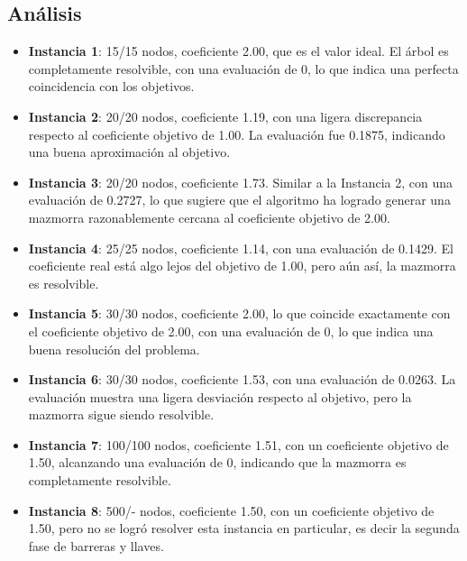 \documentclass[letter, 10pt]{article}
\begin{document}
\subsection*{An\'alisis}

\begin{itemize}
    \item \textbf{Instancia 1}: 15/15 nodos, coeficiente 2.00, que es el valor ideal. El \'arbol es completamente resolvible, con una evaluaci\'on de 0, lo que indica una perfecta coincidencia con los objetivos.
    
    \item \textbf{Instancia 2}: 20/20 nodos, coeficiente 1.19, con una ligera discrepancia respecto al coeficiente objetivo de 1.00. La evaluaci\'on fue 0.1875, indicando una buena aproximaci\'on al objetivo.
    
    \item \textbf{Instancia 3}: 20/20 nodos, coeficiente 1.73. Similar a la Instancia 2, con una evaluaci\'on de 0.2727, lo que sugiere que el algoritmo ha logrado generar una mazmorra razonablemente cercana al coeficiente objetivo de 2.00.
    
    \item \textbf{Instancia 4}: 25/25 nodos, coeficiente 1.14, con una evaluaci\'on de 0.1429. El coeficiente real est\'a algo lejos del objetivo de 1.00, pero a\'un as\'i, la mazmorra es resolvible.
    
    \item \textbf{Instancia 5}: 30/30 nodos, coeficiente 2.00, lo que coincide exactamente con el coeficiente objetivo de 2.00, con una evaluaci\'on de 0, lo que indica una buena resoluci\'on del problema.
    
    \item \textbf{Instancia 6}: 30/30 nodos, coeficiente 1.53, con una evaluaci\'on de 0.0263. La evaluaci\'on muestra una ligera desviaci\'on respecto al objetivo, pero la mazmorra sigue siendo resolvible.
    
    \item \textbf{Instancia 7}: 100/100 nodos, coeficiente 1.51, con un coeficiente objetivo de 1.50, alcanzando una evaluaci\'on de 0, indicando que la mazmorra es completamente resolvible.
    
    \item \textbf{Instancia 8}: 500/- nodos, coeficiente 1.50, con un coeficiente objetivo de 1.50, pero no se logr\'o resolver esta instancia en particular, es decir la segunda fase de barreras y llaves.
\end{itemize}
\end{document}
